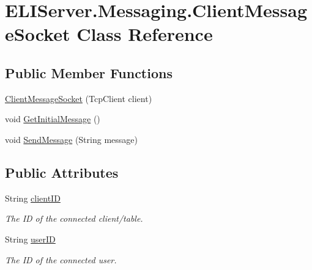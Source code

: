 \hypertarget{class_e_l_i_server_1_1_messaging_1_1_client_message_socket}{}\section{E\+L\+I\+Server.\+Messaging.\+Client\+Message\+Socket Class Reference}
\label{class_e_l_i_server_1_1_messaging_1_1_client_message_socket}


 


\subsection*{Public Member Functions}
\begin{DoxyCompactItemize}
\item 
\hyperlink{class_e_l_i_server_1_1_messaging_1_1_client_message_socket_ae2c5fabcf44e180e767e22dbbe797174}{Client\+Message\+Socket} (Tcp\+Client client)
\item 
void \hyperlink{class_e_l_i_server_1_1_messaging_1_1_client_message_socket_ae337f033eec166081fc56f6a35a22c8f}{Get\+Initial\+Message} ()
\item 
void \hyperlink{class_e_l_i_server_1_1_messaging_1_1_client_message_socket_a0b1b4e6b86d3724706b8abf34a7a061c}{Send\+Message} (String message)
\end{DoxyCompactItemize}
\subsection*{Public Attributes}
\begin{DoxyCompactItemize}
\item 
String \hyperlink{class_e_l_i_server_1_1_messaging_1_1_client_message_socket_afdf35ffe78727bb8d1b1e53a9dd48760}{client\+ID}
\begin{DoxyCompactList}\small\item\em The ID of the connected client/table. \end{DoxyCompactList}\item 
String \hyperlink{class_e_l_i_server_1_1_messaging_1_1_client_message_socket_a133a6eff37e294286e2777799bc644f4}{user\+ID}
\begin{DoxyCompactList}\small\item\em The ID of the connected user. \end{DoxyCompactList}\end{DoxyCompactItemize}

